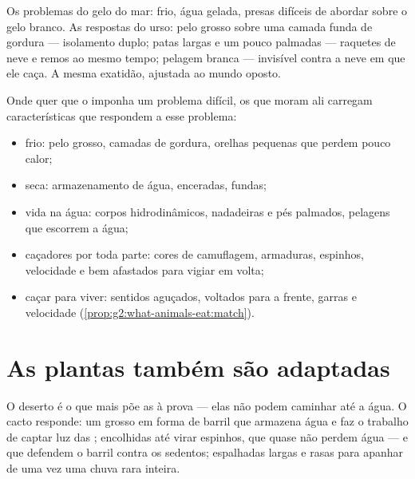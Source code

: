 \begin{example}\label{ex:g4:adapted-to-their-world:bear}
Os problemas do gelo do mar: frio, água gelada, presas difíceis de
abordar sobre o gelo branco. As respostas do urso: pelo grosso sobre
uma camada funda de gordura --- isolamento duplo; patas largas e um
pouco palmadas --- raquetes de neve e remos ao mesmo tempo; pelagem
branca --- invisível contra a neve em que ele caça. A mesma
exatidão, ajustada ao mundo oposto.
\end{example}

\begin{proposition}\label{prop:g4:adapted-to-their-world:answers}
Onde quer que o  imponha um problema difícil, os 
que moram ali carregam características que respondem a esse problema:
\begin{itemize}
  \item frio: pelo grosso, camadas de gordura, orelhas pequenas que
        perdem pouco calor;
  \item seca: armazenamento de água,  enceradas,  fundas;
  \item vida na água: corpos hidrodinâmicos, nadadeiras e pés
        palmados, pelagens que escorrem a água;
  \item caçadores por toda parte: cores de camuflagem, armaduras,
        espinhos, velocidade e  bem afastados para vigiar em
        volta;
  \item caçar para viver: sentidos aguçados,  voltados para a
        frente, garras e velocidade
        (\cref{prop:g2:what-animals-eat:match}).
\end{itemize}
\end{proposition}
\admitted

\section{As plantas também são adaptadas}

\begin{example}[O cacto]\label{ex:g4:adapted-to-their-world:cactus}
O deserto é o que mais põe as  à prova --- elas não podem
caminhar até a água. O cacto responde: um  grosso em forma de
barril que armazena água e faz o trabalho de captar luz das ;
 encolhidas até virar espinhos, que quase não perdem água ---
e que defendem o barril contra os  sedentos;  espalhadas
largas e rasas para apanhar de uma vez uma chuva rara inteira.
\end{example}

